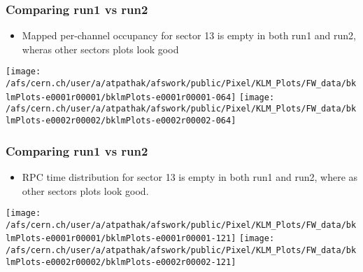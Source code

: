 \documentclass{beamer}
\begin{document}
\begin{frame}
\frametitle{Comparing run1 vs run2}
\vspace*{.05cm}

\begin{itemize} 
\item {\small Mapped per-channel occupancy for sector 13 is empty in both run1 and run2, wheras other sectors plots look good}
\end{itemize}

\begin{center}
\begin{normalsize}

\vspace*{-.2cm}
\begin{center}

\texttt{[image: /afs/cern.ch/user/a/atpathak/afswork/public/Pixel/KLM\_Plots/FW\_data/bklmPlots-e0001r00001/bklmPlots-e0001r00001-064]}
\texttt{[image: /afs/cern.ch/user/a/atpathak/afswork/public/Pixel/KLM\_Plots/FW\_data/bklmPlots-e0002r00002/bklmPlots-e0002r00002-064]} \\

\end{center}
\end{normalsize}
\end{center}
\end{frame}
\begin{frame}
\frametitle{Comparing run1 vs run2}
\vspace*{.05cm}

\begin{itemize} 
\item {\small RPC time distribution for sector 13 is empty in both run1 and run2, where as other sectors plots look good.}
\end{itemize}

\begin{center}
\begin{normalsize}

\vspace*{-.2cm}
\begin{center}

\texttt{[image: /afs/cern.ch/user/a/atpathak/afswork/public/Pixel/KLM\_Plots/FW\_data/bklmPlots-e0001r00001/bklmPlots-e0001r00001-121]}
\texttt{[image: /afs/cern.ch/user/a/atpathak/afswork/public/Pixel/KLM\_Plots/FW\_data/bklmPlots-e0002r00002/bklmPlots-e0002r00002-121]} \\

\end{center}
\end{normalsize}
\end{center}
\end{frame}
\end{document}
